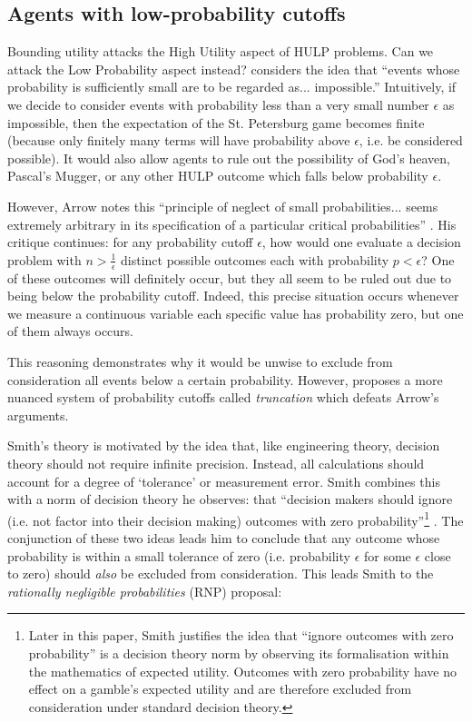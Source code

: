 \documentclass{article}
\begin{document}
\subsection{Agents with low-probability cutoffs}

Bounding utility attacks the High Utility aspect of HULP problems. Can we attack the Low Probability aspect instead? \citep[pg. 414]{arrow1951alternative} considers the idea that ``events whose probability is sufficiently small are to be regarded as... impossible.'' Intuitively, if we decide to consider events with probability less than a very small number \(\epsilon\) as impossible, then the expectation of the St. Petersburg game becomes finite (because only finitely many terms will have probability above \(\epsilon\), i.e. be considered possible). It would also allow agents to rule out the possibility of God's heaven, Pascal's Mugger, or any other HULP outcome which falls below probability \(\epsilon\).

However, Arrow notes this ``principle of neglect of small probabilities... seems extremely arbitrary in its specification of a particular critical probabilities'' \citep[pg. 414]{arrow1951alternative}. His critique continues: for any probability cutoff \(\epsilon\), how would one evaluate a decision problem with \(n > \frac{1}{\epsilon}\) distinct possible outcomes each with probability \(p < \epsilon\)? One of these outcomes will definitely occur, but they all seem to be ruled out due to being below the probability cutoff. Indeed, this precise situation occurs whenever we measure a continuous variable \textemdash{} each specific value has probability zero, but one of them always occurs.

This reasoning demonstrates why it would be unwise to exclude from consideration all events below a certain probability. However, \citep{smith2014evaluative} proposes a more nuanced system of probability cutoffs called \textit{truncation} which defeats Arrow's arguments.

Smith's theory is motivated by the idea that, like engineering theory, decision theory should not require infinite precision. Instead, all calculations should account for a degree of `tolerance' or measurement error. Smith combines this with a norm of decision theory he observes: that ``decision makers should ignore (i.e. not factor into their decision making) outcomes with zero probability''\footnote{Later in this paper, Smith justifies the idea that ``ignore outcomes with zero probability'' is a decision theory norm by observing its formalisation within the mathematics of expected utility. Outcomes with zero probability have no effect on a gamble's expected utility and are therefore excluded from consideration under standard decision theory.} \citep[pg. 472]{smith2014evaluative}. The conjunction of these two ideas leads him to conclude that any outcome whose probability is within a small tolerance of zero (i.e. probability \(\epsilon\) for some \(\epsilon\) close to zero) should \textit{also} be excluded from consideration. This leads Smith to the \textit{rationally negligible probabilities} (RNP) proposal:
\end{document}
